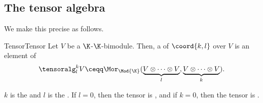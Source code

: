 \subsection{The tensor algebra}

We make this precise as follows.
\begin{dfn}{Tensor}{Tensor}
	Let $V$ be a $\K$-$\K$-bimodule.  Then, a  of  $\coord{k,l}$ over $V$ is an element of
	\begin{equation}\label{eqn5.4.2}
		\tensoralg _l^kV\ceqq \Mor _{\Mod{\K}}(\underbrace{V\otimes \cdots \otimes V}_l,\underbrace{V\otimes \cdots \otimes V}_k).
	\end{equation}
	\begin{rmk}
		$k$ is the  and $l$ is the .  If $l=0$, then the tensor is , and if $k=0$, then the tensor is .
		

\end{rmk}
\end{dfn}
